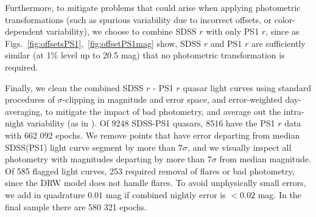 \documentclass[twocolumn]{aastex62}
\begin{document}
Furthermore, to mitigate problems that could arise when applying photometric transformations (such as spurious variability due to incorrect offsets, or color-dependent variability), we choose to combine SDSS $r$ with only PS1 $r$, since as Figs.~\ref{fig:offsetsPS1},~\ref{fig:offsetPS1mag} show, SDSS $r$ and PS1 $r$ are sufficiently similar (at 1\% level up to 20.5 mag) that no photometric transformation is required. 

Finally, we clean the combined SDSS $r$ - PS1 $r$ quasar light curves using standard procedures of  $\sigma$-clipping in magnitude and error space, and error-weighted day-averaging, to mitigate the impact of bad photometry, and average out the intra-night variability (as in \citealt{charisi2016,suberlak2017}). Of 9248 SDSS-PS1 quasars, 8516 have the PS1 $r$ data with 662 092 epochs.  We remove points that have error departing from median SDSS(PS1) light curve segment by more than $7 \sigma$, and we visually inspect all photometry with magnitudes departing by more than  $7\sigma$ from median magnitude. Of 585 flagged light curves, 253 required removal of flares or bad photometry, since the DRW model does not handle flares. To avoid unphysically small errors,  we add in quadrature $0.01$ mag if combined nightly error is $<0.02$ mag. In the final sample there are 580 321 epochs. 


 

\begin{figure*} %
	\caption{Regions of color-color (upper left, upper right, bottom left), and color-magnitude (bottom right)  space occupied by SDSS S82 quasars (color) and stars (contours). We use quasar median photometry from \citet{schneider2010}, and standard stars catalog of \citet{ivezic2007}, showing a random subset of 10 000 stars. As seen in the bottom-left panel, quasars occupy a particular range of SDSS $g-i$ color. Therefore in fitting the linear color transformations we limit the color range to  $-0.35<(g-i)<0.75$ (vertical dashed lines in Fig.\ref{fig:offsetsPS1}). Quasars also overlap other variable sources (eg. RR Lyrae), not shown here \citep{sesar2007}. }
	\label{fig:quasarColors}
\end{figure*} 



\begin{figure*}%
	\caption{The SDSS-PS1 offsets, derived with the SDSS standard stars~\citep{ivezic2007}. From randomly chosen subset of 100 000 SDSS stars, 95 000 have PS1 DR2 data. To minimize scatter due to larger errors  we select a subset of 40 000 stars with  $r < 19$ mag. Vertical dashed lines mark the region in the SDSS color space occupied by quasars (see Fig.~\ref{fig:quasarColors}), used to fit the stellar locus with a first order polynomial, marked by the solid red line. The best-fit slopes: 0.619, -0.04, -0.283 for PS1 $g$, $r$, $i$, respectively, are listed as $B_{1}$ in Table~\ref{tab:offsets}.}
	\label{fig:offsetsPS1}
\end{figure*} 
\end{document}

